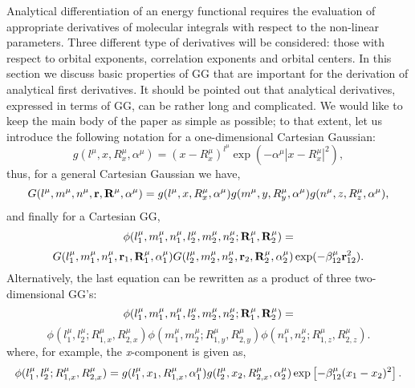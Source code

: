 Analytical differentiation of an energy functional requires the evaluation
of appropriate derivatives of molecular integrals with respect to the
non-linear parameters. Three different type of derivatives will be
considered: those with respect to orbital exponents, correlation exponents
and orbital centers. In this section we discuss basic properties of GG that
are important for the derivation of analytical first derivatives. It should
be pointed out that analytical derivatives, expressed in terms of GG, can be
rather long and complicated. We would like to keep the main body of the
paper as simple as possible; to that extent, let us introduce the following
notation for a one-dimensional Cartesian Gaussian: 
\begin{equation}
g(l^\mu ,x,R_x^\mu ,\alpha ^\mu )=(x-R_x^\mu )^{l^\mu }\exp (-\alpha ^\mu
|x-R_x^\mu |^2),
\end{equation}
thus, for a general Cartesian Gaussian we have, 
\begin{equation}
G(l^\mu ,m^\mu ,n^\mu ,{\bf r},{\bf R}^\mu ,\alpha ^\mu )=g(l^\mu ,x,R_x^\mu
,\alpha ^\mu )g(m^\mu ,y,R_y^\mu ,\alpha ^\mu )g(n^\mu ,z,R_z^\mu ,\alpha
^\mu ),
\end{equation}
and finally for a Cartesian GG, 
\[
\phi (l_1^\mu ,m_1^\mu ,n_1^\mu ,l_2^\mu ,m_2^\mu ,n_2^\mu ;{\bf R}_1^\mu ,%
{\bf R}_2^\mu )=
\]
\begin{equation}
G(l_1^\mu ,m_1^\mu ,n_1^\mu ,{\bf r}_1,{\bf R}_1^\mu ,\alpha _1^\mu
)G(l_2^\mu ,m_2^\mu ,n_2^\mu ,{\bf r}_2,{\bf R}_2^\mu ,\alpha _2^\mu )\exp
(-\beta _{12}^\mu {\bf r}_{12}^2).  \label{eq3}
\end{equation}
Alternatively, the last equation can be rewritten as a product of three
two-dimensional GG's: 
\[
\phi (l_1^\mu ,m_1^\mu ,n_1^\mu ,l_2^\mu ,m_2^\mu ,n_2^\mu ;{\bf R}_1^\mu ,%
{\bf R}_2^\mu )=
\]
\begin{equation}
\phi (l_1^\mu ,l_2^\mu ;R_{1,x}^\mu ,R_{2,x}^\mu )\phi (m_1^\mu ,m_2^\mu
;R_{1,y}^\mu ,R_{2,y}^\mu )\phi (n_1^\mu ,n_2^\mu ;R_{1,z}^\mu ,R_{2,z}^\mu )%
\text{.}
\end{equation}
where, for example, the {\it x}-component is given as,
\[
\phi (l_1^\mu ,l_2^\mu ;R_{1,x}^\mu ,R_{2,x}^\mu )=g(l_1^\mu
,x_1,R_{1,x}^\mu ,\alpha _1^\mu )g(l_2^\mu ,x_2,R_{2,x}^\mu ,\alpha _2^\mu
)\exp \left[ -\beta _{12}^\mu {\bf (}x_1-x_2)^2\right] .
\]

